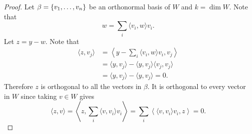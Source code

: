 \documentclass{subfiles}
\begin{document}
\begin{proof}
    Let $\beta = \qty{v_1, \ldots, v_n}$ be an orthonormal basis of $W$ and $k = \dim W$. Note that
    \[
        w = \sum_i \langle v_i, w \rangle v_i
    .\]
    Let $z = y - w$. Note that
    \begin{align*}
        \langle z, v_j \rangle &= \left\langle y - \sum_i \langle v_i, w \rangle v_i, v_j \right\rangle \\ 
        &= \langle y, v_j \rangle - \langle y, v_j \rangle \langle v_j, v_j \rangle \\
        &= \langle y, v_j \rangle - \langle y, v_j \rangle = 0.
    \end{align*}
    Therefore $z$ is orthogonal to all the vectors in $\beta$. It is orthogonal to every vector in $W$ since taking $v \in W$ gives
    \[
        \langle z, v \rangle = \left\langle z, \sum_i \langle v, v_i \rangle v_i \right\rangle  = \sum_i \left\langle \langle v, v_i \rangle v_i, z \right\rangle = 0
    .\]
\end{proof}
\end{document}
